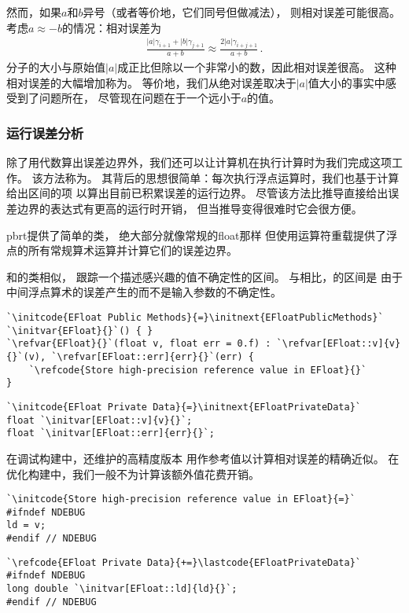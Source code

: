 然而，如果$a$和$b$异号（或者等价地，它们同号但做减法），
则相对误差可能很高。考虑$a\approx-b$的情况：相对误差为
\begin{align*}
    \frac{|a|\gamma_{i+1}+|b|\gamma_{j+1}}{a+b}\approx\frac{2|a|\gamma_{i+j+1}}{a+b}\, .
\end{align*}
分子的大小与原始值$|a|$成正比但除以一个非常小的数，因此相对误差很高。
这种相对误差的大幅增加称为。
等价地，我们从绝对误差取决于$|a|$值大小的事实中感受到了问题所在，
尽管现在问题在于一个远小于$a$的值。

\subsubsection*{运行误差分析}
除了用代数算出误差边界外，我们还可以让计算机在执行计算时为我们完成这项工作。
该方法称为。
其背后的思想很简单：每次执行浮点运算时，我们也基于计算给出区间的项
以算出目前已积累误差的运行边界。
尽管该方法比推导直接给出误差边界的表达式有更高的运行时开销，
但当推导变得很难时它会很方便。

pbrt提供了简单的类，
绝大部分就像常规的{\ttfamily float}那样
但使用运算符重载提供了浮点的所有常规算术运算并计算它们的误差边界。

和的类相似，
跟踪一个描述感兴趣的值不确定性的区间。
与相比，的区间是
由于中间浮点算术的误差产生的而不是输入参数的不确定性。
\begin{lstlisting}
`\initcode{EFloat Public Methods}{=}\initnext{EFloatPublicMethods}`
`\initvar{EFloat}{}`() { }
`\refvar{EFloat}{}`(float v, float err = 0.f) : `\refvar[EFloat::v]{v}{}`(v), `\refvar[EFloat::err]{err}{}`(err) {
    `\refcode{Store high-precision reference value in EFloat}{}`
}
\end{lstlisting}

\begin{lstlisting}
`\initcode{EFloat Private Data}{=}\initnext{EFloatPrivateData}`
float `\initvar[EFloat::v]{v}{}`;
float `\initvar[EFloat::err]{err}{}`;
\end{lstlisting}

在调试构建中，还维护的高精度版本
用作参考值以计算相对误差的精确近似。
在优化构建中，我们一般不为计算该额外值花费开销。
\begin{lstlisting}
`\initcode{Store high-precision reference value in EFloat}{=}`
#ifndef NDEBUG
ld = v;
#endif // NDEBUG
\end{lstlisting}
\begin{lstlisting}
`\refcode{EFloat Private Data}{+=}\lastcode{EFloatPrivateData}`
#ifndef NDEBUG
long double `\initvar[EFloat::ld]{ld}{}`;
#endif // NDEBUG
\end{lstlisting}

